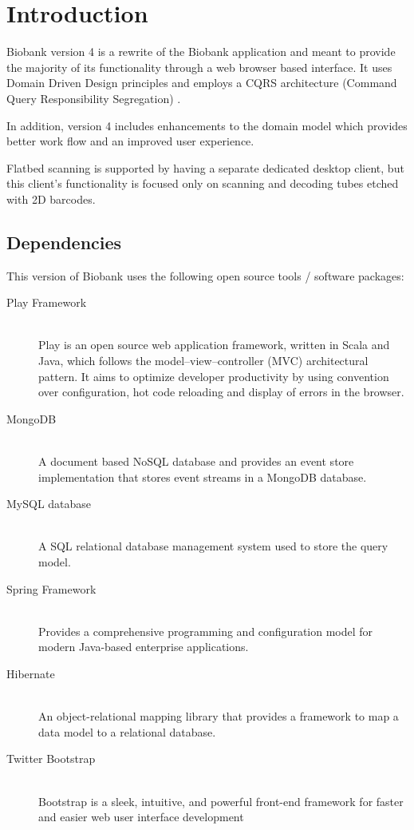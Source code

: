 \chapter{Introduction}

Biobank version 4 is a rewrite of the Biobank application and meant to provide
the majority of its functionality through a web browser based interface. It
uses Domain Driven Design principles \cite{evans2004domain} and employs a CQRS
architecture (Command Query Responsibility Segregation)
\cite{vernon2013implementing}.

In addition, version 4 includes enhancements to the domain model which provides
better work flow and an improved user experience.

Flatbed scanning is supported by having a separate dedicated desktop client,
but this client's functionality is focused only on scanning and decoding tubes
etched with 2D barcodes.

\section{Dependencies}

This version of Biobank uses the following open source tools / software packages:

\begin{description}

  \item[Play Framework] \hfill \\ Play is an open source web application
    framework, written in Scala and Java, which follows the
    model–view–controller (MVC) architectural pattern. It aims to optimize
    developer productivity by using convention over configuration, hot code
    reloading and display of errors in the browser.

  \item[MongoDB ] \hfill \\ A document based NoSQL database and provides an
    event store implementation that stores event streams in a MongoDB database.

  \item[MySQL database ] \hfill \\ A SQL relational database management system
    used to store the query model.

  \item[Spring Framework ] \hfill \\ Provides a comprehensive programming and
    configuration model for modern Java-based enterprise applications.

  \item[Hibernate] \hfill \\ An object-relational mapping library that
    provides a framework to map a data model to a relational database.

  \item[Twitter Bootstrap ] \hfill \\ Bootstrap is a sleek, intuitive, and
    powerful front-end framework for faster and easier web user interface
    development \cite{bootstrap}

\end{description}

